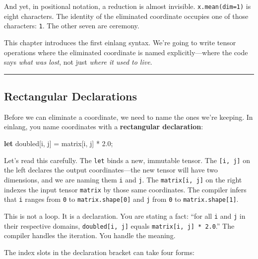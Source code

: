 \documentclass[11pt,]{article}
\newenvironment{Shaded}{}{}
\newcommand{\DecValTok}[1]{\textcolor[rgb]{0.25,0.63,0.44}{#1}}
\newcommand{\KeywordTok}[1]{\textcolor[rgb]{0.00,0.44,0.13}{\textbf{#1}}}
\newcommand{\NormalTok}[1]{#1}
\newcommand{\OperatorTok}[1]{\textcolor[rgb]{0.40,0.40,0.40}{#1}}
\begin{document}
And yet, in positional notation, a reduction is almost invisible.
\texttt{x.mean(dim=1)} is eight characters. The identity of the
eliminated coordinate occupies one of those characters: \texttt{1}. The
other seven are ceremony.

This chapter introduces the first einlang syntax. We're going to write
tensor operations where the eliminated coordinate is named
explicitly---where the code says \emph{what was lost}, not just
\emph{where it used to live}.

\begin{center}\rule{0.5\linewidth}{0.4pt}\end{center}

\hypertarget{rectangular-declarations}{%
\subsection{Rectangular Declarations}\label{rectangular-declarations}}

Before we can eliminate a coordinate, we need to name the ones we're
keeping. In einlang, you name coordinates with a \textbf{rectangular
declaration}:

\begin{Shaded}
\begin{Highlighting}[]
\KeywordTok{let}\NormalTok{ doubled}\OperatorTok{[}\NormalTok{i, j}\OperatorTok{]}\NormalTok{ = matrix}\OperatorTok{[}\NormalTok{i, j}\OperatorTok{]}\NormalTok{ * }\DecValTok{2.0}\NormalTok{;}
\end{Highlighting}
\end{Shaded}

Let's read this carefully. The \texttt{let} binds a new, immutable
tensor. The \texttt{{[}i,\ j{]}} on the left declares the output
coordinates---the new tensor will have two dimensions, and we are naming
them \texttt{i} and \texttt{j}. The \texttt{matrix{[}i,\ j{]}} on the
right indexes the input tensor \texttt{matrix} by those same
coordinates. The compiler infers that \texttt{i} ranges from \texttt{0}
to \texttt{matrix.shape{[}0{]}} and \texttt{j} from \texttt{0} to
\texttt{matrix.shape{[}1{]}}.

This is not a loop. It is a declaration. You are stating a fact: ``for
all \texttt{i} and \texttt{j} in their respective domains,
\texttt{doubled{[}i,\ j{]}} equals \texttt{matrix{[}i,\ j{]}\ *\ 2.0}.''
The compiler handles the iteration. You handle the meaning.

The index slots in the declaration bracket can take four forms:
\end{document}
